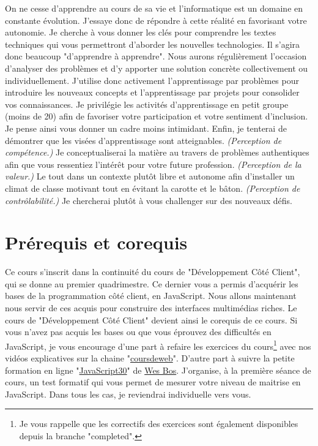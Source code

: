 On ne cesse d’apprendre au cours de sa vie et l’informatique est un domaine en constante évolution. J’essaye donc de répondre à cette réalité en favorisant votre autonomie. Je cherche à vous donner les clés pour comprendre les textes techniques qui vous permettront d’aborder les nouvelles technologies. Il s’agira donc beaucoup "d’apprendre à apprendre". Nous aurons régulièrement l’occasion d’analyser des problèmes et d’y apporter une solution concrète collectivement ou individuellement. J’utilise donc activement l’apprentissage par problèmes pour introduire les nouveaux concepts et l’apprentissage par projets pour consolider vos connaissances. Je privilégie les activités d’apprentissage en petit groupe (moins de 20) afin de favoriser votre participation et votre sentiment d’inclusion. Je pense ainsi vous donner un cadre moins intimidant.
Enfin, je tenterai de démontrer que les visées d’apprentissage sont atteignables. \textit{(Perception de compétence.)} Je conceptualiserai la matière au travers de problèmes authentiques afin que vous ressentiez l'intérêt pour votre future profession. \textit{(Perception de la valeur.)} Le tout dans un contexte plutôt libre et autonome afin d'installer un climat de classe motivant \cite{viau1994motivation} tout en évitant la carotte et le bâton. \textit{(Perception de contrôlabilité.)} Je chercherai plutôt à vous challenger sur des nouveaux défis.

\clearpage
\section{Prérequis et corequis}

Ce cours s’inscrit dans la continuité du cours de "Développement Côté Client", qui se donne au premier quadrimestre. Ce dernier vous a permis d’acquérir les bases de la programmation côté client, en JavaScript. Nous allons maintenant nous servir de ces acquis pour construire des interfaces multimédias riches. Le cours de "Développement Côté Client" devient ainsi le corequis de ce cours.
Si vous n’avez pas acquis les bases ou que vous éprouvez des difficultés en JavaScript, je vous encourage d’une part à refaire les exercices du cours\footnote{Je vous rappelle que les correctifs des exercices sont également disponibles depuis la branche "completed".} avec nos vidéos explicatives sur la chaine "\href{https://www.youtube.com/@coursdeweb}{coursdeweb}". D’autre part à suivre la petite formation en ligne "\href{https://javascript30.com}{JavaScript30}" de \href{https://wesbos.com}{Wes Bos}. J'organise, à la première séance de cours, un test formatif qui vous permet de mesurer votre niveau de maitrise en JavaScript. Dans tous les cas, je reviendrai individuelle vers vous.

